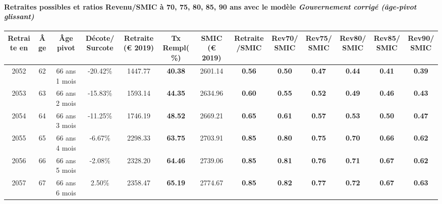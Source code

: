 \paragraph{Retraites possibles et ratios Revenu/SMIC à 70, 75, 80, 85, 90 ans avec le modèle \emph{Gouvernement corrigé (âge-pivot glissant)}}  
 
{ \scriptsize \begin{center} 
\begin{tabular}[htb]{|c|c||c|c||c|c||c||c|c|c|c|c|c|} 
\hline 
 Retraite en &  Âge &  Âge pivot &  Décote/Surcote &  Retraite (\euro{} 2019) &  Tx Rempl(\%) &  SMIC (\euro{} 2019) &  Retraite/SMIC &  Rev70/SMIC &  Rev75/SMIC &  Rev80/SMIC &  Rev85/SMIC &  Rev90/SMIC \\ 
\hline \hline 
 2052 &  62 &  66 ans 1 mois &  -20.42\% &  1447.77 &  {\bf 40.38} &  2601.14 &  {\bf {\color{red} 0.56}} &  {\bf {\color{red} 0.50}} &  {\bf {\color{red} 0.47}} &  {\bf {\color{red} 0.44}} &  {\bf {\color{red} 0.41}} &  {\bf {\color{red} 0.39}} \\ 
\hline 
 2053 &  63 &  66 ans 2 mois &  -15.83\% &  1593.14 &  {\bf 44.35} &  2634.96 &  {\bf {\color{red} 0.60}} &  {\bf {\color{red} 0.55}} &  {\bf {\color{red} 0.52}} &  {\bf {\color{red} 0.49}} &  {\bf {\color{red} 0.46}} &  {\bf {\color{red} 0.43}} \\ 
\hline 
 2054 &  64 &  66 ans 3 mois &  -11.25\% &  1746.19 &  {\bf 48.52} &  2669.21 &  {\bf {\color{red} 0.65}} &  {\bf {\color{red} 0.61}} &  {\bf {\color{red} 0.57}} &  {\bf {\color{red} 0.53}} &  {\bf {\color{red} 0.50}} &  {\bf {\color{red} 0.47}} \\ 
\hline 
 2055 &  65 &  66 ans 4 mois &  -6.67\% &  2298.33 &  {\bf 63.75} &  2703.91 &  {\bf {\color{red} 0.85}} &  {\bf {\color{red} 0.80}} &  {\bf {\color{red} 0.75}} &  {\bf {\color{red} 0.70}} &  {\bf {\color{red} 0.66}} &  {\bf {\color{red} 0.62}} \\ 
\hline 
 2056 &  66 &  66 ans 5 mois &  -2.08\% &  2328.20 &  {\bf 64.46} &  2739.06 &  {\bf {\color{red} 0.85}} &  {\bf {\color{red} 0.81}} &  {\bf {\color{red} 0.76}} &  {\bf {\color{red} 0.71}} &  {\bf {\color{red} 0.67}} &  {\bf {\color{red} 0.62}} \\ 
\hline 
 2057 &  67 &  66 ans 6 mois &  2.50\% &  2358.47 &  {\bf 65.19} &  2774.67 &  {\bf {\color{red} 0.85}} &  {\bf {\color{red} 0.82}} &  {\bf {\color{red} 0.77}} &  {\bf {\color{red} 0.72}} &  {\bf {\color{red} 0.67}} &  {\bf {\color{red} 0.63}} \\ 
\hline 
\hline 
\end{tabular} 
\end{center} } 

